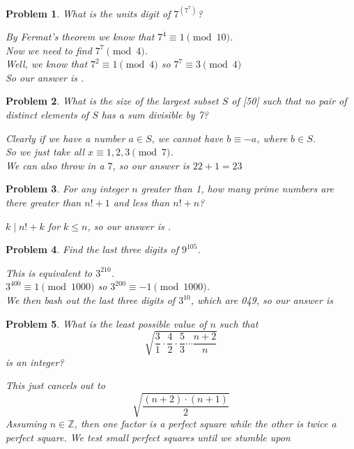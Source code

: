 \documentclass[12pt]{scrartcl}
\newtheorem{a_problem}{Problem}
\begin{document}
\begin{a_problem}
	What is the units digit of $7^{\left(7^7\right)}$?
	\begin{soln}
		By Fermat's theorem we know that $7^4 \equiv 1 \pmod{10}$. \\
		Now we need to find $7^7 \pmod{4}$. \\
		Well, we know that $7^2 \equiv 1 \pmod 4$ so $7^7 \equiv 3 \pmod4$ \\
		So our answer is .
	\end{soln}
\end{a_problem}

\begin{a_problem}
	What is the size of the largest subset $S$ of [50] such that no pair of distinct elements of $S$ has a sum divisible by 7?
	\begin{soln}
	Clearly if we have a number $a \in S$, we cannot have $b \equiv -a$, where $b \in S$. \\
	So we just take all $x \equiv 1,2,3 \pmod7$. \\
	We can also throw in a $7$, so our answer is $22 + 1 = \boxed{23}$
	\end{soln}
\end{a_problem}

\setcounter{a_problem}{380}
\begin{a_problem}
	For any integer $n$ greater than 1, how many prime numbers are there greater than $n! + 1$ and less than $n! + n$?
	\begin{soln}
		$k \mid n! + k$ for $k \leq n$, so our answer is \boxed{0}.
	\end{soln}
\end{a_problem}
\begin{a_problem}
	Find the last three digits of $9^{105}$.
	\begin{soln}
		This is equivalent to $3^{210}$. \\
		$3^{400} \equiv 1 \pmod{1000}$ so $3^{200} \equiv -1 \pmod{1000}$. \\
		We then bash out the last three digits of $3^{10}$, which are 049, so our answer is \boxed{951}
		
	\end{soln}
\end{a_problem}

\begin{a_problem}
	What is the least possible value of $n$ such that
	\[\sqrt{\frac31 \cdot \frac42 \cdot \frac53 \cdots \frac{n+2}n}\]
	is an integer?
	\begin{soln}
		This just cancels out to
		\[\sqrt{\frac{(n+2) \cdot (n+1)}{2}}\]
		Assuming $n \in \mathbb{Z}$, then one factor is a perfect square while the other is twice a perfect square. We test small perfect squares until we stumble upon \boxed{n=7}
	\end{soln}
\end{a_problem}
\end{document}
